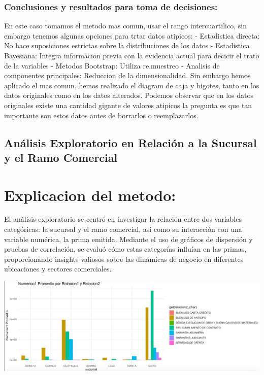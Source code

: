 \documentclass[
]{article}
\begin{document}
\subsubsection{Conclusiones y resultados para toma de
decisiones:}\label{conclusiones-y-resultados-para-toma-de-decisiones}

En este caso tomamos el metodo mas comun, usar el rango intercuartilico,
sin embargo tenemos algunas opciones para trtar datos atipicos: -
Estadistica directa: No hace suposiciones estrictas sobre la
distribuciones de los datos - Estadistica Bayesiana: Integra informacion
previa con la evidencia actual para decicir el trato de la variables -
Metodos Bootstrap: Utiliza re.muestreo - Analisis de componentes
principales: Reduccion de la dimensionalidad. Sin embargo hemos aplicado
el mas comun, hemos realizado el diagram de caja y bigotes, tanto en los
datos originales como en los datos alterados. Podemos observar que en
los datos originales existe una cantidad gigante de valores atipicos la
pregunta es que tan importante son estos datos antes de borrarlos o
reemplazarlos.

\subsection{Análisis Exploratorio en Relación a la Sucursal y el Ramo
Comercial}\label{anuxe1lisis-exploratorio-en-relaciuxf3n-a-la-sucursal-y-el-ramo-comercial}

\section{Explicacion del metodo:}\label{explicacion-del-metodo}

El análisis exploratorio se centró en investigar la relación entre dos
variables categóricas: la sucursal y el ramo comercial, así como su
interacción con una variable numérica, la prima emitida. Mediante el uso
de gráficos de dispersión y pruebas de correlación, se evaluó cómo estas
categorías influían en las primas, proporcionando insights valiosos
sobre las dinámicas de negocio en diferentes ubicaciones y sectores
comerciales.

\includegraphics{PHOTO-2024-06-13-15-10-15.jpg}
\end{document}
